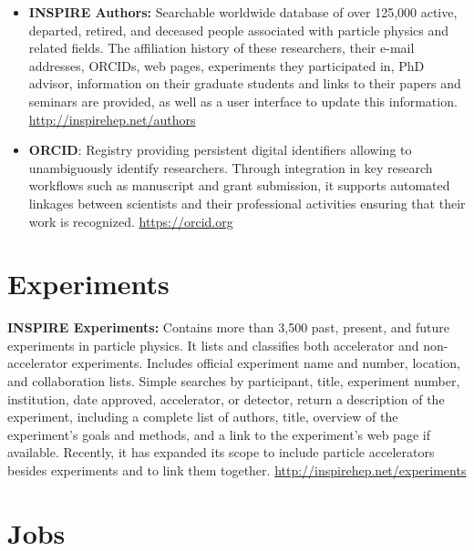 \begin{itemize}
\item
  \textbf{INSPIRE Authors:} Searchable worldwide database of over
  125,000 active, departed, retired, and deceased people associated with
  particle physics and related fields. The affiliation history of these
  researchers, their e-mail addresses, ORCIDs, web pages, experiments
  they participated in, PhD advisor, information on their graduate
  students and links to their papers and seminars are provided, as well as a user interface to update this
  information. \url{http://inspirehep.net/authors}

\item
  \textbf{ORCID}: Registry providing persistent digital identifiers
  allowing to unambiguously identify researchers. Through integration in
  key research workflows such as manuscript and grant submission, it
  supports automated linkages between scientists and their professional
  activities ensuring that their work is recognized.
  \url{https://orcid.org}
\end{itemize}

\section{Experiments}\label{databases:sec:experiments}

  \textbf{INSPIRE Experiments:} Contains more than 3,500 past, present,
  and future experiments in particle physics. It lists and classifies both accelerator and
  non-accelerator experiments. Includes official experiment name and
  number, location, and collaboration lists. Simple searches by
  participant, title, experiment number, institution, date approved,
  accelerator, or detector, return a description of the experiment,
  including a complete list of authors, title, overview of the
  experiment's goals and methods, and a link to the experiment's web
  page if available. Recently, it has expanded its scope to include
  particle accelerators besides experiments and to link them together.
  \url{http://inspirehep.net/experiments}

\section{Jobs}\label{databases:sec:jobs}

